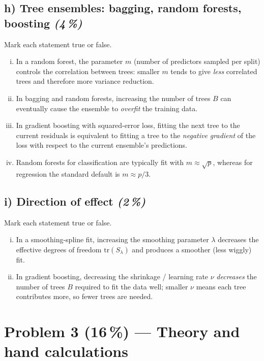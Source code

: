 \documentclass[11pt,a4paper]{article}
\newcommand{\points}[1]{\textbf{(#1\,\%)}}
\newcommand{\subpoints}[1]{\textit{(#1\,\%)}}
\begin{document}
\subsection*{h) Tree ensembles: bagging, random forests, boosting \subpoints{4}}
Mark each statement true or false.
\begin{enumerate}[(i)]
  \item In a random forest, the parameter $m$ (number of predictors sampled per split) controls the correlation between trees: smaller $m$ tends to give \emph{less} correlated trees and therefore more variance reduction.
  \item In bagging and random forests, increasing the number of trees $B$ can eventually cause the ensemble to \emph{overfit} the training data.
  \item In gradient boosting with squared-error loss, fitting the next tree to the current residuals is equivalent to fitting a tree to the \emph{negative gradient} of the loss with respect to the current ensemble's predictions.
  \item Random forests for classification are typically fit with $m \approx \sqrt{p}$, whereas for regression the standard default is $m \approx p/3$.
\end{enumerate}

\subsection*{i) Direction of effect \subpoints{2}}
Mark each statement true or false.
\begin{enumerate}[(i)]
  \item In a smoothing-spline fit, increasing the smoothing parameter $\lambda$ decreases the effective degrees of freedom $\mathrm{tr}(S_\lambda)$ and produces a smoother (less wiggly) fit.
  \item In gradient boosting, decreasing the shrinkage / learning rate $\nu$ \emph{decreases} the number of trees $B$ required to fit the data well; smaller $\nu$ means each tree contributes more, so fewer trees are needed.
\end{enumerate}

\vfill\eject

\section*{Problem 3 \points{16} --- Theory and hand calculations}
\end{document}
